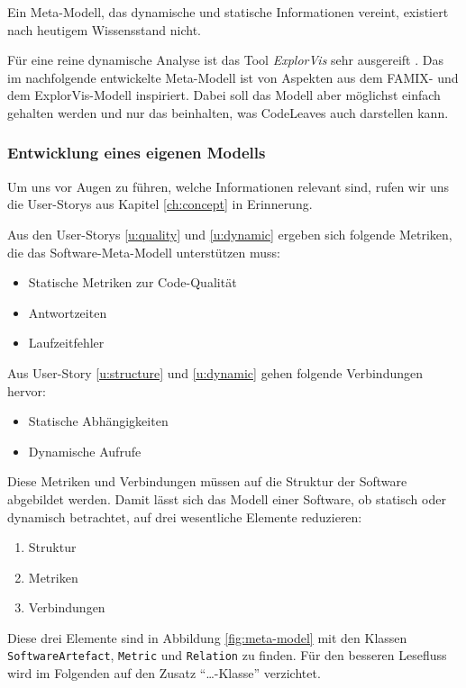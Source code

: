 Ein Meta-Modell, das dynamische und statische Informationen vereint, existiert nach heutigem Wissensstand nicht.

Für eine reine dynamische Analyse ist das Tool \textit{ExplorVis} sehr ausgereift \cite{fittkau2017software}. Das im nachfolgende entwickelte Meta-Modell ist von Aspekten aus dem FAMIX- und dem ExplorVis-Modell inspiriert. Dabei soll das Modell aber möglichst einfach gehalten werden und nur das beinhalten, was CodeLeaves auch darstellen kann.

\subsubsection*{Entwicklung eines eigenen Modells}

Um uns vor Augen zu führen, welche Informationen relevant sind, rufen wir uns die User-Storys aus Kapitel \ref{ch:concept} in Erinnerung.

Aus den User-Storys \ref{u:quality} und \ref{u:dynamic} ergeben sich folgende Metriken, die das Software-Meta-Modell unterstützen muss:

\begin{itemize}
  \item Statische Metriken zur Code-Qualität
  \item Antwortzeiten
  \item Laufzeitfehler
\end{itemize}

Aus User-Story \ref{u:structure} und \ref{u:dynamic} gehen folgende Verbindungen hervor:

\begin{itemize}
  \item Statische Abhängigkeiten
  \item Dynamische Aufrufe
\end{itemize}

Diese Metriken und Verbindungen müssen auf die Struktur der Software abgebildet werden. Damit lässt sich das Modell einer Software, ob statisch oder dynamisch betrachtet, auf drei wesentliche Elemente reduzieren:

\begin{enumerate}
  \item Struktur
  \item Metriken
  \item Verbindungen
\end{enumerate}

Diese drei Elemente sind in Abbildung \ref{fig:meta-model} mit den Klassen \texttt{SoftwareArtefact}, \texttt{Metric} und \texttt{Relation} zu finden. Für den besseren Lesefluss wird im Folgenden auf den Zusatz "`\dots-Klasse"' verzichtet.

